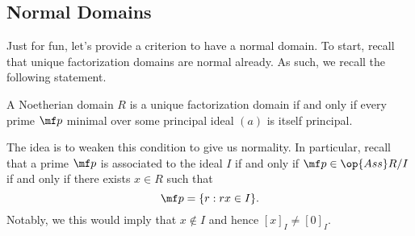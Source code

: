 \subsection{Normal Domains}
Just for fun, let's provide a criterion to have a normal domain. To start, recall that unique factorization domains are normal already. As such, we recall the following statement.
\begin{prop}
	A Noetherian domain $R$ is a unique factorization domain if and only if every prime $\mf p$ minimal over some principal ideal $(a)$ is itself principal.
\end{prop}
The idea is to weaken this condition to give us normality. In particular, recall that a prime $\mf p$ is associated to the ideal $I$ if and only if $\mf p\in\op{Ass}R/I$ if and only if there exists $x\in R$ such that
\[\mf p=\{r:rx\in I\}.\]
Notably, we this would imply that $x\notin I$ and hence $[x]_I\ne[0]_I$.

